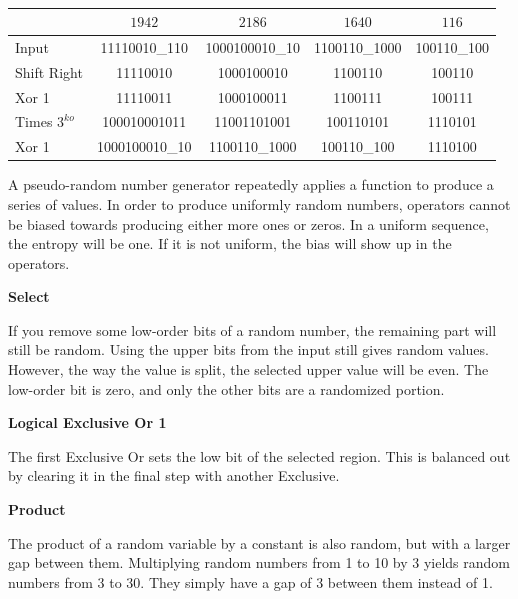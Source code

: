 \documentclass[letterpaper]{article}
\begin{document}
\begin{multicols}{2}
    \begin{table}
        \centering
        \begin{tabular}{|l|c|c|c|c|}
            \hline
                           & \textbf{$1942$} & \textbf{$2186$} & \textbf{$1640$} & \textbf{$116$} \\
            \hline
            Input          & 11110010\_110   & 1000100010\_10  & 1100110\_1000   & 100110\_100    \\
            \hline
            Shift Right    & 11110010        & 1000100010      & 1100110         & 100110         \\
            \hline
            Xor 1          & 11110011        & 1000100011      & 1100111         & 100111         \\
            \hline
            Times $3^{ko}$ & 100010001011    & 11001101001     & 100110101       & 1110101        \\
            \hline
            Xor 1          & 1000100010\_10  & 1100110\_1000   & 100110\_100     & 1110100        \\
            \hline
        \end{tabular}
        \caption{}
    \end{table}

    A pseudo-random number generator repeatedly applies a function to produce a series of values. In order to produce uniformly random numbers, operators cannot be biased towards producing either more ones or zeros. In a uniform sequence, the entropy will be one. If it is not uniform, the bias will show up in the operators.

    \textbf{Select}

    If you remove some low-order bits of a random number, the remaining part will still be random. Using the upper bits from the input still gives random values. However, the way the value is split, the selected upper value will be even. The low-order bit is zero, and only the other bits are a randomized portion.

    \textbf{Logical Exclusive Or 1}

    The first Exclusive Or sets the low bit of the selected region. This is balanced out by clearing it in the final step with another Exclusive.

    \textbf{Product}

    The product of a random variable by a constant is also random, but with a larger gap between them. Multiplying random numbers from 1 to 10 by 3 yields random numbers from 3 to 30. They simply have a gap of 3 between them instead of 1.


\end{multicols}
\end{document}
